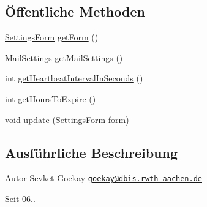 \subsection*{Öffentliche Methoden}
\begin{DoxyCompactItemize}
\item 
\hyperlink{classde_1_1rwth_1_1idsg_1_1steve_1_1web_1_1dto_1_1_settings_form}{Settings\+Form} \hyperlink{classde_1_1rwth_1_1idsg_1_1steve_1_1repository_1_1impl_1_1_settings_repository_impl_ac3743a338781f8c9eeab3e0ede3652b7}{get\+Form} ()
\item 
\hyperlink{classde_1_1rwth_1_1idsg_1_1steve_1_1repository_1_1dto_1_1_mail_settings}{Mail\+Settings} \hyperlink{classde_1_1rwth_1_1idsg_1_1steve_1_1repository_1_1impl_1_1_settings_repository_impl_a90d0b0738265bccd8cadb907e2597456}{get\+Mail\+Settings} ()
\item 
int \hyperlink{classde_1_1rwth_1_1idsg_1_1steve_1_1repository_1_1impl_1_1_settings_repository_impl_a931f65fcf63715ee23aebfebef8e8153}{get\+Heartbeat\+Interval\+In\+Seconds} ()
\item 
int \hyperlink{classde_1_1rwth_1_1idsg_1_1steve_1_1repository_1_1impl_1_1_settings_repository_impl_adb245c43d680fee335aa561bf1a63d3d}{get\+Hours\+To\+Expire} ()
\item 
void \hyperlink{classde_1_1rwth_1_1idsg_1_1steve_1_1repository_1_1impl_1_1_settings_repository_impl_afa3ed87dc4194aaceeb52bcba1ec447f}{update} (\hyperlink{classde_1_1rwth_1_1idsg_1_1steve_1_1web_1_1dto_1_1_settings_form}{Settings\+Form} form)
\end{DoxyCompactItemize}


\subsection{Ausführliche Beschreibung}
\begin{DoxyAuthor}{Autor}
Sevket Goekay \href{mailto:goekay@dbis.rwth-aachen.de}{\tt goekay@dbis.\+rwth-\/aachen.\+de} 
\end{DoxyAuthor}
\begin{DoxySince}{Seit}
06.. 
\end{DoxySince}


